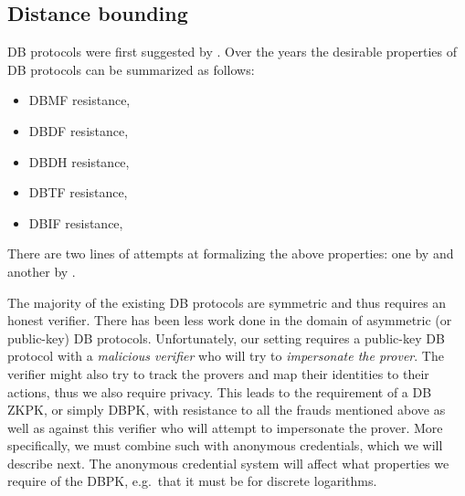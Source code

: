 \subsection{Distance bounding}%
\label{DistanceBounding}

\Ac{DB} protocols were first suggested by \citet{DistanceBounding}.
Over the years the desirable properties of \ac{DB} protocols can be summarized 
as follows:
\begin{itemize}
  \item \ac{DBMF} resistance,
  \item \ac{DBDF} resistance,
  \item \ac{DBDH} resistance,
  \item \ac{DBTF} resistance,
  \item \ac{DBIF} resistance,
\end{itemize}
There are two lines of attempts at formalizing the above properties: one by 
\citet{DB-BMV} and another by \citet{DB-DFKO}.

The majority of the existing \ac{DB} protocols are symmetric and thus requires 
an honest verifier.
There has been less work done in the domain of asymmetric (or public-key) 
\ac{DB} protocols.
Unfortunately, our setting requires a public-key \ac{DB} protocol with a 
\emph{malicious verifier} who will try to \emph{impersonate the prover}.
The verifier might also try to track the provers and map their identities to 
their actions, thus we also require privacy.
This leads to the requirement of a \ac{DB} \ac{ZKPK}, or simply \ac{DBPK}, with 
resistance to all the frauds mentioned above as well as against this verifier 
who will attempt to impersonate the prover.
More specifically, we must combine such  with anonymous credentials, 
which we will describe next.
The anonymous credential system will affect what properties we require of the 
\ac{DBPK}, e.g.\ that it must be  for discrete logarithms.

